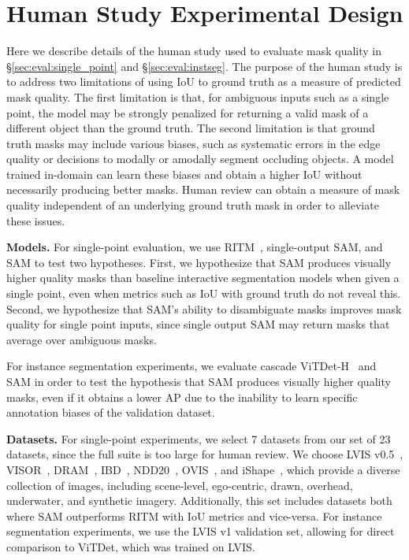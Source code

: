 \documentclass[10pt,twocolumn,letterpaper]{article}
\renewcommand{\paragraph}[1]{\vspace{1.25mm}\noindent\textbf{#1}}
\newcommand{\sam}{SAM\xspace}
\begin{document}
\section{Human Study Experimental Design}\label{app:human_study}

Here we describe details of the human study used to evaluate mask quality in \S\ref{sec:eval:single_point} and \S\ref{sec:eval:instseg}. The purpose of the human study is to address two limitations of using IoU to ground truth as a measure of predicted mask quality. The first limitation is that, for ambiguous inputs such as a single point, the model may be strongly penalized for returning a valid mask of a different object than the ground truth. The second limitation is that ground truth masks may include various biases, such as systematic errors in the edge quality or decisions to modally or amodally segment occluding objects. A model trained in-domain can learn these biases and obtain a higher IoU without necessarily producing better masks. Human review can obtain a measure of mask quality independent of an underlying ground truth mask in order to alleviate these issues.

\paragraph{Models.} For single-point evaluation, we use RITM~\cite{sofiiuk2022reviving}, single-output \sam, and \sam to test two hypotheses. First, we hypothesize that \sam produces visually higher quality masks than baseline interactive segmentation models when given a single point, even when metrics such as IoU with ground truth do not reveal this. Second, we hypothesize that \sam's ability to disambiguate masks improves mask quality for single point inputs, since single output \sam may return masks that average over ambiguous masks.

For instance segmentation experiments, we evaluate cascade \mbox{ViTDet-H}~\cite{li2022exploring} and \sam in order to test the hypothesis that \sam produces visually higher quality masks, even if it obtains a lower AP due to the inability to learn specific annotation biases of the validation dataset.

\paragraph{Datasets.} For single-point experiments, we select 7 datasets from our set of 23 datasets, since the full suite is too large for human review. We choose LVIS v0.5~\cite{chen20223D}, VISOR~\cite{VISOR, EpicKitchens}, DRAM~\cite{DRAM}, IBD~\cite{chen20223D}, NDD20~\cite{ndd20}, OVIS~\cite{ovis}, and iShape~\cite{iShape}, which provide a diverse collection of images, including scene-level, ego-centric, drawn, overhead, underwater, and synthetic imagery. Additionally, this set includes datasets both where \sam outperforms RITM with IoU metrics and vice-versa. For instance segmentation experiments, we use the LVIS v1 validation set, allowing for direct comparison to ViTDet, which was trained on LVIS.
\end{document}
